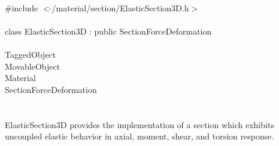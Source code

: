 
   \\
\indent \#include $<\tilde{ }$/material/section/ElasticSection3D.h$>$  \\

  \\
\indent class ElasticSection3D : public SectionForceDeformation \\

 \\
\indent TaggedObject \\
\indent MovableObject \\
\indent\indent Material \\
\indent\indent\indent SectionForceDeformation \\
\indent\indent\indent{} \\

  \\
\indent ElasticSection3D provides the implementation of a
section which exhibits uncoupled elastic behavior in axial, moment,
shear, and torsion response. \\


